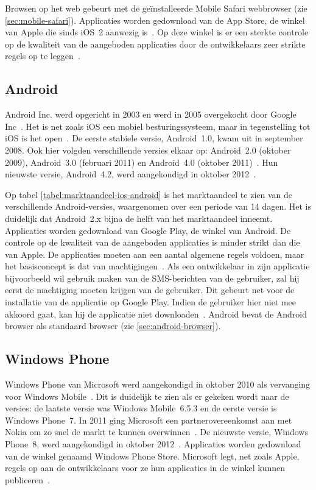Browsen op het web gebeurt met de geïnstalleerde Mobile Safari webbrowser (zie \ref{sec:mobile-safari}). 
Applicaties worden gedownload van de App Store, de winkel van Apple die sinds iOS~2 aanwezig is~\cite{Deitel2012}. 
Op deze winkel is er een sterkte controle op de kwaliteit van de aangeboden applicaties door de ontwikkelaars zeer strikte regels op te leggen~\cite{Apple2010a}.

\subsection{Android}
Android Inc. werd opgericht in 2003 en werd in 2005 overgekocht door Google Inc~\cite{Satyesh2012}. 
Het is net zoals iOS een mobiel besturingssysteem, maar in tegenstelling tot iOS is het open~\cite{David2011}. 
De eerste stabiele versie, Android~1.0, kwam uit in september 2008. 
Ook hier volgden verschillende versies elkaar op: Android~2.0 (oktober 2009), Android~3.0 (februari 2011) en Android~4.0 (oktober 2011)~\cite{Satyesh2012}. 
Hun nieuwste versie, Android~4.2, werd aangekondigd in oktober 2012~\cite{Sawers2012}. 

Op tabel \ref{tabel:marktaandeel-ios-android} is het marktaandeel te zien van de verschillende Android-versies, waargenomen over een periode van 14 dagen. 
Het is duidelijk dat Android~2.x bijna de helft van het marktaandeel inneemt.
Applicaties worden gedownload van Google Play,  de winkel van Android. 
De controle op de kwaliteit van de aangeboden applicaties is minder strikt dan die van Apple.
De applicaties moeten aan een aantal algemene regels voldoen, maar het basisconcept is dat van machtigingen~\cite{Android2013b}.
Als een ontwikkelaar in zijn applicatie bijvoorbeeld wil gebruik maken van de SMS-berichten van de gebruiker, zal hij eerst de machtiging moeten krijgen van de gebruiker.
Dit gebeurt net voor de installatie van de applicatie op Google Play.
Indien de gebruiker hier niet mee akkoord gaat, kan hij de applicatie niet downloaden~\cite{Android2013a}.
Android bevat de Android browser als standaard browser (zie \ref{sec:android-browser}).

\subsection{Windows Phone}
Windows Phone van Microsoft werd aangekondigd in oktober 2010 als vervanging voor Windows Mobile~\cite{Seitz2010,Lieberman2010}. 
Dit is duidelijk te zien als er gekeken wordt naar de versies: de laatste versie was Windows Mobile~6.5.3 en de eerste versie is Windows Phone~7. 
In 2011 ging Microsoft een partnerovereenkomst aan met Nokia om zo snel de markt te kunnen overwinnen~\cite{Microsoft2011}. 
De nieuwste versie, Windows Phone~8, werd aangekondigd in oktober 2012~\cite{Reed2012}. 
Applicaties worden gedownload van de winkel genaamd Windows Phone Store.
Microsoft legt, net zoals Apple, regels op aan de ontwikkelaars voor ze hun applicaties in de winkel kunnen publiceren~\cite{Microsoft2013a}.

